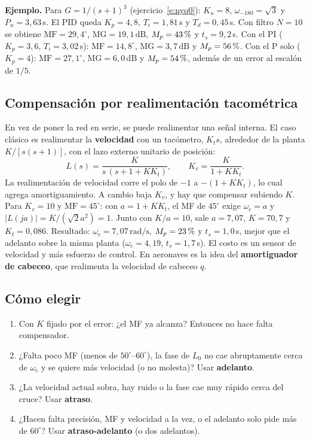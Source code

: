 \documentclass[11pt,a4paper]{article}
\newcounter{ejer}
\newcommand{\pct}{\ensuremath{\,\mathchar"7025}}
\newcommand{\dB}{\,\mathrm{dB}}
\newcommand{\rads}{\,\mathrm{rad/s}}
\newcommand{\MF}{\mathrm{MF}}
\newcommand{\MG}{\mathrm{MG}}
\newcommand{\wc}{\omega_c}
\newcommand{\wf}{\omega_{-180}}
\begin{document}
\textbf{Ejemplo.} Para $G=1/(s+1)^3$ (ejercicio~\ref{e:nyq0}): $K_u=8$, $\wf=\sqrt3$ y $P_u=3{,}63$\,s. El PID queda $K_p=4{,}8$, $T_i=1{,}81$\,s y $T_d=0{,}45$\,s.
Con filtro $N=10$ se obtiene $\MF=29{,}4^\circ$, $\MG=19{,}1\dB$, $M_p=43\pct{}$ y $t_s=9{,}2$\,s. Con el PI ($K_p=3{,}6$, $T_i=3{,}02$\,s): $\MF=14{,}8^\circ$, $\MG=3{,}7\dB$ y $M_p=56\pct{}$. Con el P solo ($K_p=4$): $\MF=27{,}1^\circ$,
$\MG=6{,}0\dB$ y $M_p=54\pct{}$, además de un error al escalón de $1/5$.

\subsection{Compensación por realimentación tacométrica}
En vez de poner la red en serie, se puede realimentar una señal interna. El caso clásico es realimentar la \textbf{velocidad} con un tacómetro,
$K_ts$, alrededor de la planta $K/[s(s+1)]$, con el lazo externo unitario de posición:
\[
L(s)=\frac{K}{s\,(s+1+KK_t)},\qquad K_v=\frac{K}{1+KK_t}.
\]
La realimentación de velocidad corre el polo de $-1$ a $-(1+KK_t)$, lo cual agrega amortiguamiento. A cambio baja $K_v$, y hay que compensar subiendo $K$.
Para $K_v=10$ y $\MF=45^\circ$: con $a=1+KK_t$, el MF de $45^\circ$ exige $\wc=a$ y $|L(ja)|=K/(\sqrt2a^2)=1$. Junto con $K/a=10$, sale $a=7{,}07$,
$K=70{,}7$ y $K_t=0{,}086$. Resultado: $\wc=7{,}07\rads$, $M_p=23\pct{}$ y $t_s=1{,}0$\,s, mejor que el adelanto sobre la misma planta ($\wc=4{,}19$, $t_s=1{,}7$\,s).
El costo es un sensor de velocidad y más esfuerzo de control. En aeronaves es la idea del \textbf{amortiguador de cabeceo}, que realimenta la velocidad de cabeceo $q$.

\subsection{Cómo elegir}
\begin{receta}
\begin{enumerate}[label=\textbf{\arabic*.}]
\item Con $K$ fijado por el error: ¿el MF ya alcanza? Entonces no hace falta compensador.
\item ¿Falta poco MF (menos de $50^\circ$--$60^\circ$), la fase de $L_0$ no cae abruptamente cerca de $\wc$ y se quiere más velocidad (o no molesta)?
      Usar \textbf{adelanto}.
\item ¿La velocidad actual sobra, hay ruido o la fase cae muy rápido cerca del cruce? Usar \textbf{atraso}.
\item ¿Hacen falta precisión, MF y velocidad a la vez, o el adelanto solo pide más de $60^\circ$? Usar \textbf{atraso-adelanto} (o dos adelantos).
\end{enumerate}
\end{receta}
\end{document}
